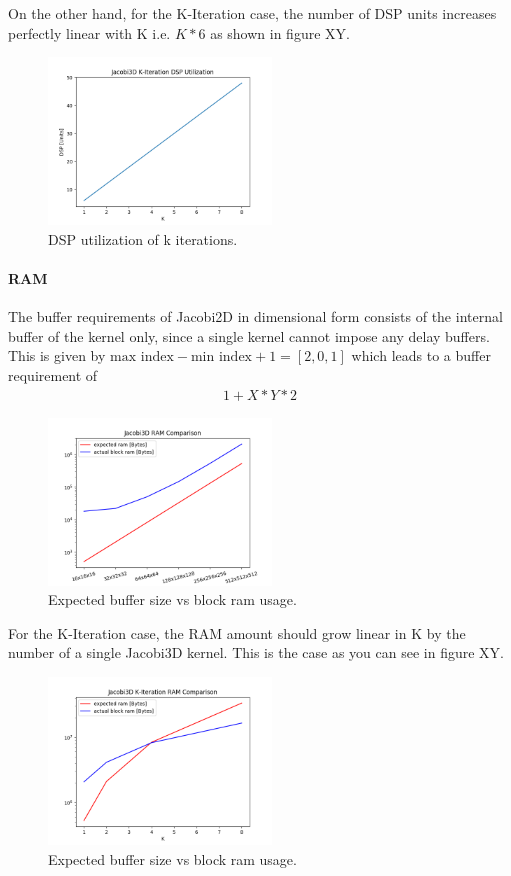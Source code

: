 On the other hand, for the K-Iteration case, the number of DSP units increases perfectly linear with K i.e. 
$K*6$ as shown in figure XY.
\begin{figure}[h]
	\centering
	\includegraphics[height=12em]{plots/jacobi3d_k_itr_dsp.png}
	\caption{DSP utilization of k iterations.}
	\label{fig:jacobi3d_k_itr_dsp}
\end{figure}




\paragraph{RAM}

The buffer requirements of Jacobi2D in dimensional form consists of the internal buffer of the kernel only, since a single kernel cannot impose any delay buffers. This is given by $\text{max index} - \text{min index} + 1 = [2, 0, 1]$ which leads to a buffer requirement of
\begin{align}
1 + X*Y*2
\end{align}

\begin{figure}[h]
	\centering
	\includegraphics[height=12em]{plots/jacobi3d_ram_comparison.png}
	\caption{Expected buffer size vs block ram usage.}
	\label{fig:jacobi3d_ram_comparison}
\end{figure}

For the K-Iteration case, the RAM amount should grow linear in K by the number of a single Jacobi3D kernel. This is the case as you can see in figure XY.
\begin{figure}[h]
	\centering
	\includegraphics[height=12em]{plots/jacobi3d_ram_comparison_k_iter.png}
	\caption{Expected buffer size vs block ram usage.}
	\label{fig:jacobi3d_ram_comparison_k_iter}
\end{figure}




